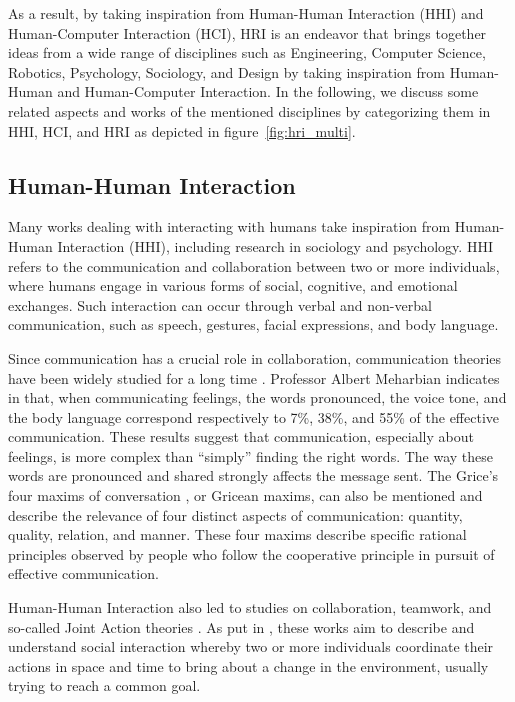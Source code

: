 As a result, by taking inspiration from Human-Human Interaction (HHI) and Human-Computer Interaction (HCI), HRI is an endeavor that brings together ideas from a wide range of disciplines such as Engineering, Computer Science, Robotics, Psychology, Sociology, and Design by taking inspiration from Human-Human and Human-Computer Interaction.
In the following, we discuss some related aspects and works of the mentioned disciplines by categorizing them in HHI, HCI, and HRI as depicted in figure~\ref{fig:hri_multi}.

\subsection{Human-Human Interaction}

Many works dealing with interacting with humans take inspiration from Human-Human Interaction (HHI), including research in sociology and psychology. HHI refers to the communication and collaboration between two or more individuals, where humans engage in various forms of social, cognitive, and emotional exchanges. Such interaction can occur through verbal and non-verbal communication, such as speech, gestures, facial expressions, and body language.   

Since communication has a crucial role in collaboration, communication theories have been widely studied for a long time \cite{cherry_human_1957,smith_designing_1998}. Professor Albert Meharbian indicates in \cite{mehrabian1967decoding} that, when communicating feelings, the words pronounced, the voice tone, and the body language correspond respectively to 7\%, 38\%, and 55\% of the effective communication. These results suggest that communication, especially about feelings, is more complex than ``simply'' finding the right words. The way these words are pronounced and shared strongly affects the message sent. The Grice's four maxims of conversation \cite{grice1975logic}, or Gricean maxims, can also be mentioned and describe the relevance of four distinct aspects of communication: quantity, quality, relation, and manner. These four maxims describe specific rational principles observed by people who follow the cooperative principle in pursuit of effective communication.

Human-Human Interaction also led to studies on collaboration, teamwork, and so-called Joint Action theories \cite{cohen_team_1970,levesque_acting_1990,cohen_teamwork_1991}. As put in \cite{sebanz_2006joint}, these works aim to describe and understand social interaction whereby two or more individuals coordinate their actions in space and time to bring about a change in the environment, usually trying to reach a common goal.

